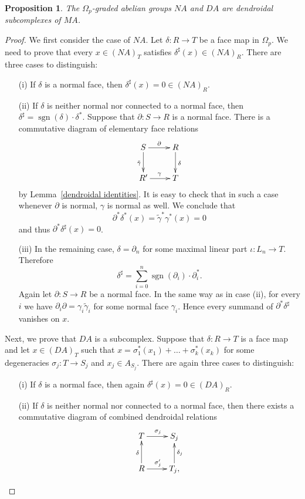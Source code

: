 \documentclass[a4paper]{amsart}
\theoremstyle{plain}
\newtheorem{prop}[thm]{Proposition}
\theoremstyle{definition}
\theoremstyle{remark}
\DeclareMathOperator{\sgn}{sgn}
\newcommand{\rpd}{\Omega_p}
\newcommand{\To}{\longrightarrow}
\numberwithin{equation}{section}
\numberwithin{figure}{section}
\begin{document}
\begin{prop}
The $\rpd$-graded abelian groups $NA$ and $DA$ are dendroidal subcomplexes of $MA$.
\end{prop}
\begin{proof}
We first consider the case of $NA$. Let $\delta\colon R\To T$ be a face map in $\rpd$. We need to prove that
every $x\in (NA)_T$ satisfies $\delta^\sharp(x)\in (NA)_R$. There are three cases to distinguish:
\begin{itemize}
\item[{\rm (i)}] If $\delta$ is a normal face, then $\delta^\sharp(x)=0\in (NA)_R$.
\item[{\rm (ii)}] If $\delta$ is neither normal nor connected to a normal face, then
$\delta^\sharp=\sgn(\delta)\cdot\delta^*$. Suppose that $\partial\colon S\To R$ is a normal face. There is a
commutative diagram of elementary face relations
\[
\xymatrix{S\ar[r]^-{\partial}\ar[d]_{\tilde\gamma} &R\ar[d]^\delta\\
R'\ar[r]^{\gamma} &T}
\]
by Lemma~\ref{dendroidal identities}. It is easy to check that in such a case whenever $\partial$ is normal, $\gamma$
is normal as well. We conclude that
\[
\partial^*\delta^*(x)=\tilde\gamma^*\gamma^*(x)=0
\]
and thus $\partial^*\delta^\sharp(x)=0$.
\item[{\rm (iii)}] In the remaining case, $\delta=\partial_n$ for some maximal linear part $\iota\colon L_n\To T$. Therefore
\[
\delta^\sharp=\sum_{i=0}^n\sgn(\partial_i)\cdot\partial_i^*.
\]
Again let $\partial\colon S\To R$ be a normal face. In the same way as in case (ii), for every $i$ we have
$\partial_i\partial=\gamma_i\tilde\gamma_i$ for some normal face $\gamma_i$. Hence every summand of
$\partial^*\delta^\sharp$ vanishes on $x$.
\end{itemize}
Next, we prove that $DA$ is a subcomplex. Suppose that $\delta\colon R\To T$ is a face map and let $x\in (DA)_T$ such that
$x=\sigma_1^*(x_1) +\ldots+\sigma_k^*(x_k)$ for some degeneracies $\sigma_j\colon T\To S_j$ and $x_j\in A_{S_j}$. There are
again three cases to distinguish:
\begin{itemize}
\item[{\rm (i)}] If $\delta$ is a normal face, then again $\delta^\sharp(x)=0\in (DA)_R$.
\item[{\rm (ii)}]If $\delta$ is neither normal nor connected to a normal face, then
there exists a commutative diagram of combined dendroidal relations
\[
\xymatrix{
T\ar[r]^{\sigma_j}&S_j\\
R\ar[r]^{\sigma_j'}\ar[u]^{\delta} &T_j\ar[u]_{\delta_j}, }
\]
\end{itemize}
\end{proof}
\end{document}
